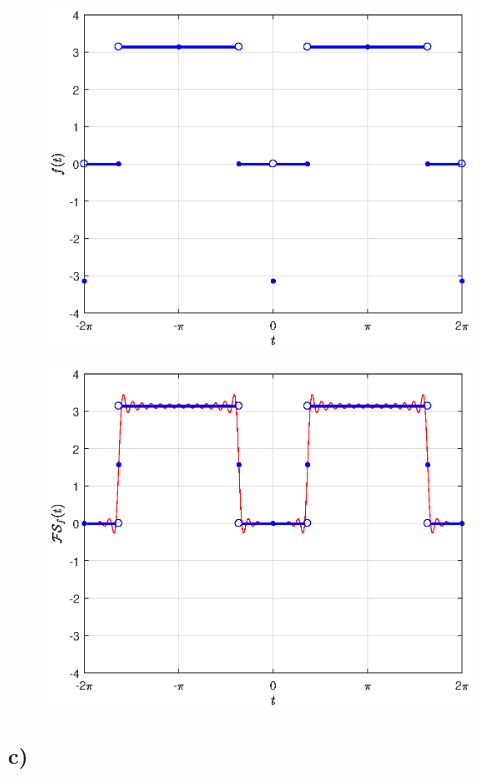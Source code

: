 \documentclass[a4paper]{article}
\begin{document}
\begin{figure}[h!]
  \centering
  \includegraphics[width=\linewidth]{funk23.eps}
  \caption{}
  \label{fig:serie22}
\end{figure} 
\begin{figure}[h!]
  \centering
  \includegraphics[width=\linewidth]{fourier23.eps}
  \caption{}
  \label{fig:serie22}
\end{figure} 

\subsection*{c)}
\end{document}

